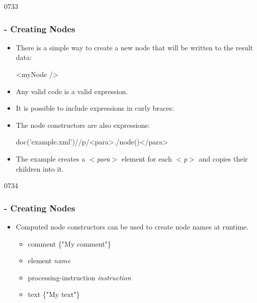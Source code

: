 \begin{slide}[fragile]{0733}
\frametitle{ - Creating Nodes}
\begin{itemize}
\item There is a simple way to create a new node that will be written to the result data:
\begin{xml}
<myNode />
\end{xml}
\item Any valid  code is a valid  expression.
\item It is possible to include expressions in curly braces:
\item  The node constructors are also expressions:
\begin{xml}
doc('example.xml')//p/<para>{./node()}</para>
\end{xml}
\item The example creates a \textit{$<$para$>$} element for each \textit{$<$p$>$} and copies their children into it.
\end{itemize}
\end{slide}

\begin{slide}{0734}
\frametitle{ - Creating Nodes}
\begin{itemize}
\item Computed node constructors can be used to create node names at runtime.
\begin{itemize}
\item comment \{"My comment"\}
\item element \textit{name}
\item processing-instruction \textit{instruction}
\item text \{"My text"\}
\end{itemize}
\end{itemize}
\end{slide}

